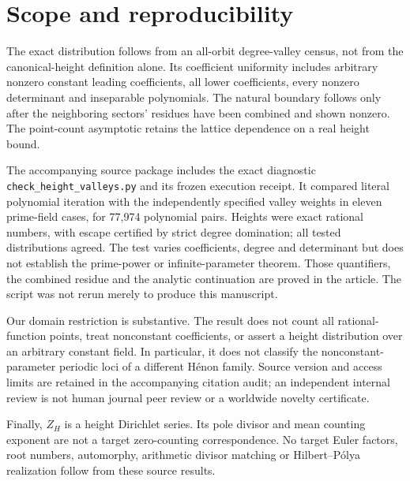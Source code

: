 \section{Scope and reproducibility}\label{sec:scope}
The exact distribution follows from an all-orbit degree-valley
census, not from the canonical-height definition alone. Its
coefficient uniformity includes arbitrary nonzero constant leading
coefficients, all lower coefficients, every nonzero determinant
and inseparable polynomials. The natural boundary follows only
after the neighboring sectors' residues have been combined and
shown nonzero. The point-count asymptotic retains the lattice
dependence on a real height bound.

The accompanying source package includes the exact diagnostic
\texttt{check\_height\_valleys.py} and its frozen execution
receipt. It compared literal polynomial iteration with the
independently specified valley weights in eleven prime-field
cases, for 77,974 polynomial pairs. Heights were exact rational
numbers, with escape certified by strict degree domination;
all tested distributions agreed. The test varies coefficients,
degree and determinant but does not establish the prime-power
or infinite-parameter theorem. Those quantifiers, the combined
residue and the analytic continuation are proved in the article.
The script was not rerun merely to produce this manuscript.

Our domain restriction is substantive. The result does not
count all rational-function points, treat nonconstant coefficients,
or assert a height distribution over an arbitrary constant field.
In particular, it does not classify the nonconstant-parameter
periodic loci of a different H\'enon family. Source version and
access limits are retained in the accompanying citation audit;
an independent internal review is not human journal peer review
or a worldwide novelty certificate.

Finally, $Z_H$ is a height Dirichlet series. Its pole divisor
and mean counting exponent are not a target zero-counting
correspondence. No target Euler factors, root numbers,
automorphy, arithmetic divisor matching or Hilbert--P\'olya
realization follow from these source results.
